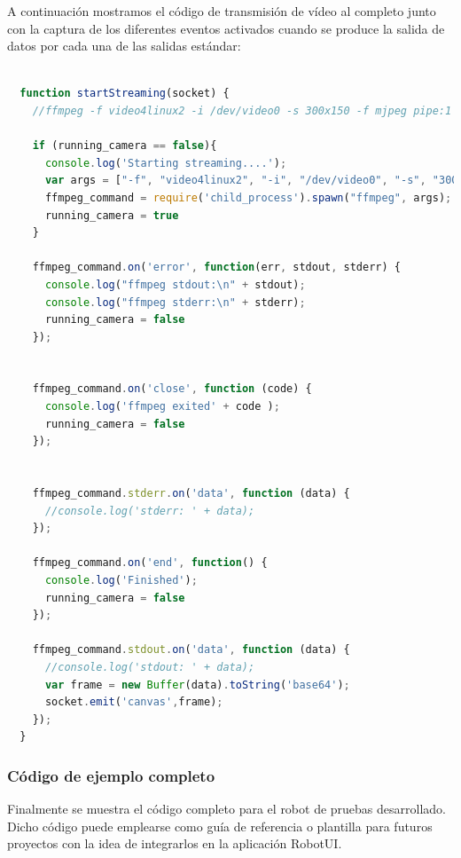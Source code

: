 A continuación mostramos el código de transmisión de vídeo al completo junto con la captura de los diferentes eventos activados cuando se produce la salida de datos por cada una de las salidas estándar:\\

\begin{lstlisting}[language=JavaScript]

  function startStreaming(socket) {
    //ffmpeg -f video4linux2 -i /dev/video0 -s 300x150 -f mjpeg pipe:1 -b:v 28k -bufsize 28k

    if (running_camera == false){
      console.log('Starting streaming....');
      var args = ["-f", "video4linux2", "-i", "/dev/video0", "-s", "300x150","-f","mjpeg", "pipe:1", "-b:v 28k", "-bufsize 28k"]
      ffmpeg_command = require('child_process').spawn("ffmpeg", args);
      running_camera = true
    }

    ffmpeg_command.on('error', function(err, stdout, stderr) {
      console.log("ffmpeg stdout:\n" + stdout);
      console.log("ffmpeg stderr:\n" + stderr);
      running_camera = false
    });


    ffmpeg_command.on('close', function (code) {
      console.log('ffmpeg exited' + code );
      running_camera = false
    });


    ffmpeg_command.stderr.on('data', function (data) {
      //console.log('stderr: ' + data);
    });

    ffmpeg_command.on('end', function() {
      console.log('Finished');
      running_camera = false
    });

    ffmpeg_command.stdout.on('data', function (data) {
      //console.log('stdout: ' + data);
      var frame = new Buffer(data).toString('base64');
      socket.emit('canvas',frame);
    });
  }

\end{lstlisting}



\subsubsection{Código de ejemplo completo}

Finalmente se muestra el código completo para el robot de pruebas desarrollado. Dicho código puede emplearse como guía de referencia o plantilla para futuros proyectos con la idea de integrarlos en la aplicación RobotUI.\\


